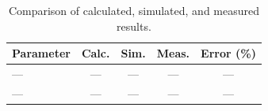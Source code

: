 \begin{table}[!htbp]
\centering
\caption{Comparison of calculated, simulated, and measured results.}
\label{tab:hardware-results}
\begin{tabularx}{\textwidth}{@{}Xcccc@{}}
\toprule
\textbf{Parameter} & \textbf{Calc.} & \textbf{Sim.} & \textbf{Meas.} & \textbf{Error (\%)} \\
\midrule
--- & --- & --- & --- & --- \\
--- & --- & --- & --- & --- \\
\bottomrule
\end{tabularx}
\end{table}

\noindent{}

